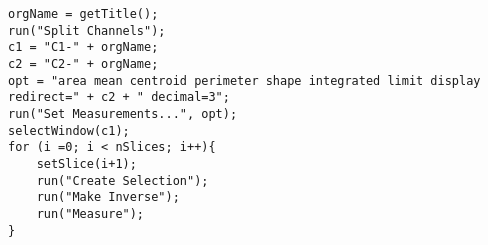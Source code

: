 \begin{lstlisting}[morekeywords={*, for, nSlices, setSlice}]
orgName = getTitle();
run("Split Channels");
c1 = "C1-" + orgName;
c2 = "C2-" + orgName;
opt = "area mean centroid perimeter shape integrated limit display redirect=" + c2 + " decimal=3";
run("Set Measurements...", opt);
selectWindow(c1);
for (i =0; i < nSlices; i++){
	setSlice(i+1);
	run("Create Selection");
	run("Make Inverse");
	run("Measure");
}


\end{lstlisting}